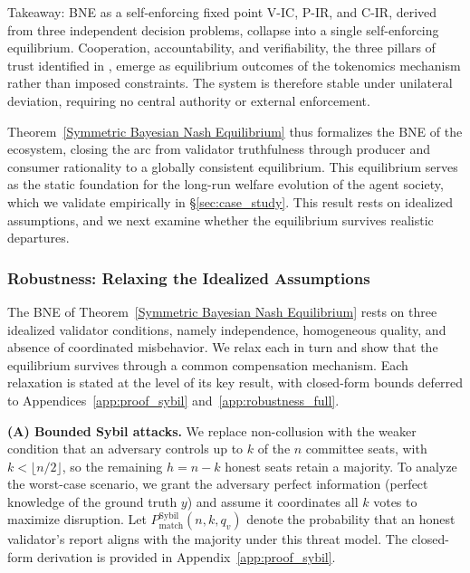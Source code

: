 \begin{interpretbox}{Takeaway: BNE as a self-enforcing fixed point}
V-IC, P-IR, and C-IR, derived from three independent decision problems, collapse into a single self-enforcing equilibrium. Cooperation, accountability, and verifiability, the three pillars of trust identified in , emerge as equilibrium outcomes of the tokenomics mechanism rather than imposed constraints. The system is therefore stable under unilateral deviation, requiring no central authority or external enforcement.
\end{interpretbox}

\noindent Theorem~\ref{Symmetric Bayesian Nash Equilibrium} thus formalizes the BNE of the ecosystem, closing the arc from validator truthfulness through producer and consumer rationality to a globally consistent equilibrium. This equilibrium serves as the static foundation for the long-run welfare evolution of the agent society, which we validate empirically in \S\ref{sec:case_study}. This result rests on idealized assumptions, and we next examine whether the equilibrium survives realistic departures.

\subsubsection{Robustness: Relaxing the Idealized Assumptions}
\label{sec:robustness}

The BNE of Theorem~\ref{Symmetric Bayesian Nash Equilibrium} rests on three idealized validator conditions, namely independence, homogeneous quality, and absence of coordinated misbehavior. We relax each in turn and show that the equilibrium survives through a common compensation mechanism. Each relaxation is stated at the level of its key result, with closed-form bounds deferred to Appendices~\ref{app:proof_sybil} and~\ref{app:robustness_full}.

\vspace{2mm}
\noindent\textbf{(A) Bounded Sybil attacks.}
We replace non-collusion with the weaker condition that an adversary controls up to $k$ of the $n$ committee seats, with $k < \lfloor n/2 \rfloor$, so the remaining $h = n - k$ honest seats retain a majority. To analyze the worst-case scenario, we grant the adversary perfect information (perfect knowledge of the ground truth $y$) and assume it coordinates all $k$ votes to maximize disruption. Let $P_{\text{match}}^{\text{Sybil}}(n, k, q_v)$ denote the probability that an honest validator's report aligns with the majority under this threat model. The closed-form derivation is provided in Appendix~\ref{app:proof_sybil}.

